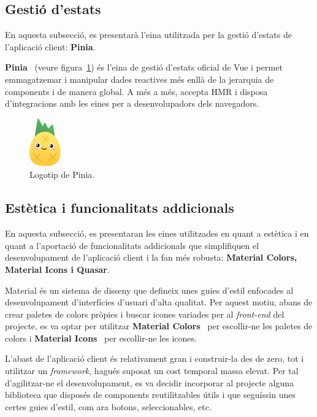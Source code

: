 \documentclass[a4paper,12pt]{ThesisStyle}
\begin{document}
\subsection{Gestió d'estats}
\label{subsec:decisions_client_estats}

En aquesta subsecció, es presentarà l'eina utilitzada per la gestió d'estats de l'aplicació client: \textbf{Pinia}.

\textbf{Pinia}~\cite{Pinia} (veure figura~\ref{img:logo_pinia}) és l'eina de gestió d'estats oficial de Vue i permet emmagatzemar i manipular dades reactives més enllà de la jerarquia de components i de manera global. A més a més, accepta HMR i disposa d'integracions amb les eines per a desenvolupadors dels navegadors.

\begin{figure}[H]
  \centering
  \includegraphics[width=0.12\textwidth]{assets/logos/Pinia.png}
  \caption{\label{img:logo_pinia}Logotip de Pinia.}
\end{figure}

\subsection{Estètica i funcionalitats addicionals}
\label{subsec:decisions_client_estetica}

En aquesta subsecció, es presentaran les eines utilitzades en quant a estètica i en quant a l'aportació de funcionalitats addicionals que simplifiquen el desenvolupament de l'aplicació client i la fan més robusta: \textbf{Material Colors, Material Icons i Quasar}.

Material és un sistema de disseny que defineix unes guies d'estil enfocades al desenvolupament d'interfícies d'usuari d'alta qualitat. Per aquest motiu, abans de crear paletes de colors pròpies i buscar icones variades per al \textit{front-end} del projecte, es va optar per utilitzar \textbf{Material Colors}~\cite{MaterialColors} per escollir-ne les paletes de colors i \textbf{Material Icons}~\cite{MaterialIcons} per escollir-ne les icones.

L'abast de l'aplicació client és relativament gran i construir-la des de zero, tot i utilitzar un \textit{framework}, hagués suposat un cost temporal massa elevat. Per tal d'agilitzar-ne el desenvolupament, es va decidir incorporar al projecte alguna biblioteca que disposés de components reutilitzables útils i que seguíssin unes certes guies d'estil, com ara botons, seleccionables, etc.
\end{document}
